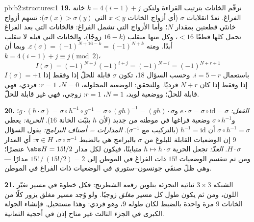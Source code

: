 \begin{solution}{pb:b2:structures:1}
\textbf{19.} نرقّم الخانات بترتيب القراءة ولتكن $k = 4(i -
1) + j$ خانة الفراغ. نعدّ انقلابات $\sigma$
(أي أزواج الخانات $x < y$ التي $\sigma(x) > \sigma(y)$): تسهم أزواج
خانتَي قطعتين بمقدار $N$؛ وأما الأزواج التي تشمل الفراغ: فالخانات
التي بعد الفراغ تحمل كلها قطعًا $< 16$، وكل منها منقلب ($16 - k$
زوجًا)، والخانات التي قبله لا تنقلب أبدًا. ومنه
$\varepsilon(\sigma) = (-1)^{N + 16 - k} = (-1)^{N + k}$. وبما أن
$k = 4(i-1) + j \equiv j \pmod 2$،
\[
I(\sigma) = (-1)^{N + j}\,(-1)^{i + j} = (-1)^{N + i}
= (-1)^{N + r + 1}
\]
باستعمال $i = 5 - r$. وحسب السؤال 18، تكون $\sigma$ قابلة للحلّ إذا وفقط إذا
$I(\sigma) = +1$ إذا وفقط إذا كان $N + r$ فرديًا. وللتحقق: الوضعية المحلولة، $N = 0$، $r
= 1$: فردي، فهي قابلة للحلّ؛ ووضعية لويد، $N = 1$، $r = 1$: زوجي، فهي غير قابلة للحلّ.

\textbf{20.} \emph{الفعل:} $e \cdot \sigma = \sigma \circ
\mathrm{id} = \sigma$ و$g \cdot (h \cdot \sigma) = \sigma
\circ h^{-1} \circ g^{-1} = \sigma \circ (gh)^{-1} = (gh) \cdot
\sigma$؛ و$\sigma \circ h^{-1}$ وضعية فراغها في موطنه
من جديد (لأن $h$ يثبّت الخانة $16$). \emph{الحرية:} يعطي $\sigma \circ
h^{-1} = \sigma$ أن $h^{-1} = \mathrm{id}$ (بالتركيب مع
$\sigma^{-1}$). \emph{المدارات = أصناف البرامج:} يقول السؤال 9
إن الوضعيات القابلة للبلوغ من $\sigma$ بالبرامج هي
بالضبط $\sigma \circ \pi^{-1}$، $\pi \in H$: أي المدار $H
\cdot \sigma$. \emph{العدّ:} تجعل الحرية $h \mapsto h \cdot
\sigma$ متباينًا، فيكون لكل مدار $\abs H = 15!/2$ عنصرًا؛
ومن ثم تنقسم الوضعيات $15!$ ذات الفراغ في الموطن إلى
$15!\,/\,(15!/2) = 2$ مدارًا --- وهي ظلّ صنفَي جونسون--ستوري
في الوضعيات ذات الفراغ في الموطن.

\textbf{21.} الشبكة $3 \times 3$ ثنائية التجزئة بتلوين
رقعة الشطرنج: فكل خطوة في مسير تغيّر اللون، ومن ثم
يكون طول كل مسير \emph{مغلق} زوجيًا. ولو وُجد مسير مغلق يزور
كلًا من الخانات $9$ مرة واحدة بالضبط لكان طوله $9$، وهو فردي:
وهذا مستحيل. فإنشاء الجولة الكبرى في الجزء الثالث غير
متاح إذن في أحجية الثمانية.


\end{solution}
